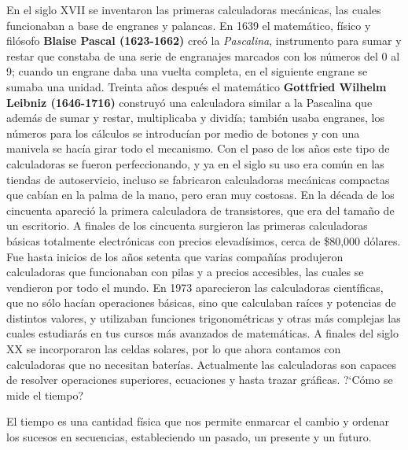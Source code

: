 \documentclass[11pt]{book}
\begin{document}
En el siglo XVII se inventaron las primeras calculadoras mec\'anicas, las cuales
funcionaban a base de engranes y palancas.
En 1639 el matem\'atico, f\'isico y fil\'osofo \textbf{Blaise Pascal (1623-1662)}
cre\'o la \emph{Pascalina}, instrumento para sumar y
restar que constaba de una serie de engranajes marcados con los n\'umeros del 0
al 9; cuando un engrane daba una vuelta completa,
en el siguiente engrane se sumaba una unidad.
Treinta años despu\'es el matem\'atico \textbf{Gottfried Wilhelm Leibniz
    (1646-1716)} construy\'o una calculadora similar a la
Pascalina que adem\'as de sumar y restar, multiplicaba y divid\'ia; tambi\'en usaba
engranes, los n\'umeros para los c\'alculos se
introduc\'ian por medio de botones y con una manivela se hac\'ia girar todo el
mecanismo.
Con el paso de los años este tipo de calculadoras se fueron perfeccionando, y
ya en el siglo su uso era com\'un en las tiendas
de autoservicio, incluso se fabricaron calculadoras mec\'anicas compactas que
cab\'ian en la palma de la mano, pero eran muy
costosas. En la d\'ecada de los cincuenta apareci\'o la primera calculadora de
transistores, que era del tamaño de un escritorio.
A finales de los cincuenta surgieron las primeras calculadoras b\'asicas
totalmente electr\'onicas con precios elevad\'isimos,
cerca de \$80,000 d\'olares. Fue hasta inicios de los años setenta que varias
compañ\'ias produjeron calculadoras que funcionaban
con pilas y a precios accesibles, las cuales se vendieron por todo el mundo. En
1973 aparecieron las calculadoras cient\'ificas,
que no s\'olo hac\'ian operaciones b\'asicas, sino que calculaban ra\'ices y potencias
de distintos valores, y utilizaban funciones
trigonom\'etricas y otras m\'as complejas las cuales estudiar\'as en tus cursos m\'as
avanzados de matem\'aticas. A finales del siglo XX
se incorporaron las celdas solares, por lo que ahora contamos con calculadoras
que no necesitan bater\'ias. Actualmente las
calculadoras son capaces de resolver operaciones superiores, ecuaciones y hasta
trazar gr\'aficas.
?`C\'omo se mide el tiempo?

El tiempo es una cantidad f\'isica que nos permite enmarcar el cambio y ordenar
los sucesos en secuencias, estableciendo un pasado,
un presente y un futuro.
\end{document}
